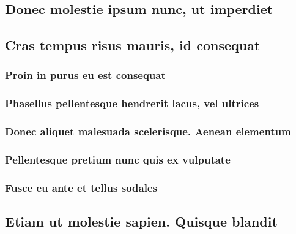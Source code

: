 \documentclass[%
  bachelor,%
  english%
  oneside,%
  debug,%
]{student}
\begin{document}
\lipsum[1-8]

\subsection{Donec molestie ipsum nunc, ut imperdiet}

\lipsum[1-8]

\subsection{Cras tempus risus mauris, id consequat}

\lipsum[1-8]

\subsubsection{Proin in purus eu est consequat}

\lipsum[1-8]

\subsubsection{Phasellus pellentesque hendrerit lacus, vel ultrices}

\lipsum[1-8]

\subsubsection{Donec aliquet malesuada scelerisque. Aenean elementum}

\lipsum[1-8]

\subsubsection{Pellentesque pretium nunc quis ex vulputate}

\lipsum[1-8]

\subsubsection{Fusce eu ante et tellus sodales}

\lipsum[1-8]

\subsection{Etiam ut molestie sapien. Quisque blandit}

\lipsum[1-8]
\end{document}
